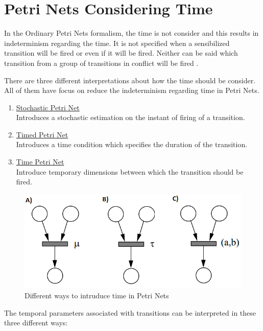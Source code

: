 \section{Petri Nets Considering Time}
	
	In the Ordinary Petri Nets formalism, the time is not consider and this results in indeterminism 
	regarding the time. It is not specified when a sensibilized transition will be fired or even if it
	will be fired. Neither can be said which transition from a group of transitions in conflict will 
	be fired \cite{garciaizquierdo}.
	
	There are three different interpretations about how the time should be consider. All of them have 
	focus on reduce the indeterminism regarding time in Petri Nets.
	\begin{enumerate}
	  	\renewcommand{\theenumi}{\Alph{enumi}}
	  	\item \underline{Stochastic Petri Net}
	  		\\
			Introduces a stochastic estimation on the instant of firing of a transition.
		\item \underline{Timed Petri Net}
			\\
			Introduces a time condition which specifies the duration of the transition.
		\item \underline{Time Petri Net}
			\\
			Introduce temporary dimensions between which the transition should be fired.
	\end{enumerate}
		
	\begin{figure}[h]
		\centering
		\includegraphics[width=1\linewidth]{./img/Petri16}
		\caption{Different ways to intruduce time in Petri Nets}
		\label{fig:Petri16}
	\end{figure}
	
	The temporal parameters associated with transitions can be interpreted in these three different
	ways\footnotemark:
	
